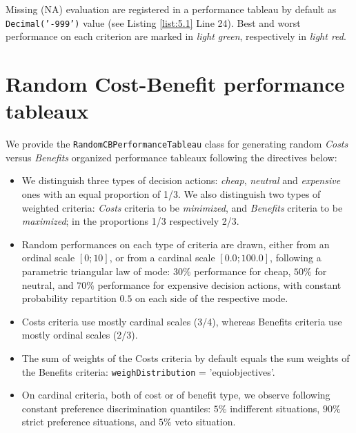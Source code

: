 \begin{svgraybox} Missing (NA) evaluation are registered in a performance tableau by default as \texttt{Decimal('-999')} value (see Listing \ref{list:5.1} Line 24). Best and worst performance on each criterion are marked in \emph{light green}, respectively in \emph{light red}. \end{svgraybox}
	    
\section{Random Cost-Benefit performance tableaux}
\label{sec:5.3}

We provide the \texttt{RandomCBPerformanceTableau} class for generating random \emph{Costs} versus \emph{Benefits} organized performance tableaux following the directives below:
\begin{itemize}
\item We distinguish three types of decision actions: \emph{cheap}, \emph{neutral} and \emph{expensive} ones with an equal proportion of 1/3. We also distinguish two types of weighted criteria: \emph{Costs} criteria to be \emph{minimized}, and \emph{Benefits} criteria to be \emph{maximized}; in the proportions 1/3 respectively 2/3. 
\item  Random performances on each type of criteria  are drawn, either from an ordinal scale $[0;10]$, or from a cardinal scale $[0.0;100.0]$, following a parametric triangular law of mode: $30\%$ performance for cheap, $50\%$ for neutral, and $70\%$ performance for expensive decision actions, with constant probability repartition $0.5$ on each side of the respective mode. 
\item Costs criteria use mostly cardinal scales (3/4), whereas Benefits criteria use mostly ordinal scales (2/3). 
\item  The sum of weights of the Costs criteria by default equals the sum weights of the Benefits criteria: \texttt{weighDistribution} = 'equiobjectives'. 
\item On cardinal criteria, both of cost or of benefit type, we observe following constant preference discrimination quantiles: $5\%$ indifferent situations, $90\%$ strict preference situations, and $5\%$ veto situation. 
\end{itemize}

